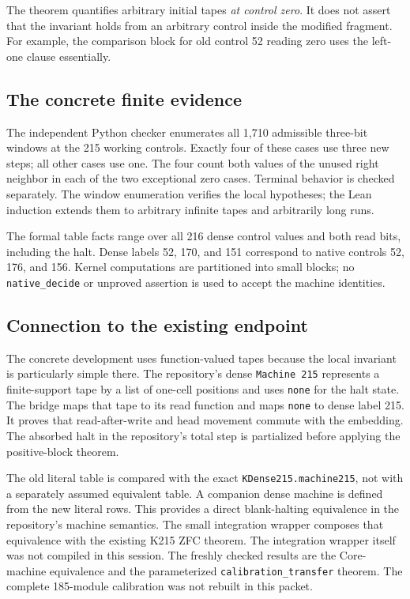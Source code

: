 \documentclass[11pt,letterpaper]{article}
\theoremstyle{definition}
\begin{document}
The theorem quantifies arbitrary initial tapes \emph{at control zero}.
It does not assert that the invariant holds from an arbitrary control
inside the modified fragment. For example, the comparison block for
old control 52 reading zero uses the left-one clause essentially.

\subsection{The concrete finite evidence}

The independent Python checker enumerates all 1,710 admissible three-bit
windows at the 215 working controls. Exactly four of these cases use
three new steps; all other cases use one. The four count both values of
the unused right neighbor in each of the two exceptional zero cases.
Terminal behavior is checked separately. The window enumeration verifies
the local hypotheses; the Lean induction extends them to arbitrary
infinite tapes and arbitrarily long runs.

The formal table facts range over all 216 dense control values and both
read bits, including the halt. Dense labels 52, 170, and 151 correspond
to native controls 52, 176, and 156. Kernel computations are partitioned
into small blocks; no \texttt{native\_decide} or unproved assertion is
used to accept the machine identities.

\subsection{Connection to the existing endpoint}\label{sec:internal}

The concrete development uses function-valued tapes because the local
invariant is particularly simple there. The repository's dense
\texttt{Machine 215} represents a finite-support tape by a list of
one-cell positions and uses \texttt{none} for the halt state. The bridge
maps that tape to its read function and maps \texttt{none} to dense label
215. It proves that read-after-write and head movement commute with the
embedding. The absorbed halt in the repository's total step is
partialized before applying the positive-block theorem.

The old literal table is compared with the exact
\texttt{KDense215.machine215}, not with a separately assumed equivalent
table. A companion dense machine is defined from the new literal rows.
This provides a direct blank-halting equivalence in the repository's
machine semantics. The small integration wrapper composes that
equivalence with the existing K215 ZFC theorem. The integration wrapper
itself was not compiled in this session. The freshly checked results are
the Core-machine equivalence and the parameterized
\texttt{calibration\_transfer} theorem. The complete 185-module calibration
was not rebuilt in this packet.
\end{document}
